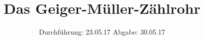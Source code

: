 

\subject{V703}
\title{Das Geiger-Müller-Zählrohr}
\date{
  Durchführung: 23.05.17
  \hspace{3em}
  Abgabe: 30.05.17
}



\maketitle
\thispagestyle{empty}
\tableofcontents
\newpage
\setcounter{page}{1}





\printbibliography


